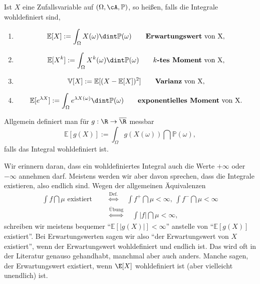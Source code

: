 \begin{deff}
	Ist $X$ eine Zufallsvariable auf $(\Omega, \cA, \mathbb{P})$, so heißen, falls die Integrale wohldefiniert sind,
	\begin{enumerate}[label=(\roman*)]
		\item \[ \mathbb{E}[X] := \int_{\Omega} X(\omega) \dint \mathbb{P}(\omega) \qquad \text{\textbf{Erwartungswert} von X}, \] 
		\item \[ \mathbb{E}[X^k] := \int_{\Omega} X^k(\omega) \dint \mathbb{P}(\omega) \qquad \text{\textbf{$k$-tes Moment} von X}, \]
		\item \[ \mathbb{V}[X] := \mathbb{E}[(X - \mathbb{E}[X])^2] \qquad \text{\textbf{Varianz} von X}, \]
		\item \[ \mathbb{E}[e^{\lambda X}] := \int_{\Omega} e^{\lambda X(\omega)} \dint \mathbb{P}(\omega) \qquad \text{\textbf{exponentielles Moment} von X.} \]
	\end{enumerate}
	Allgemein definiert man f\"ur $g:\R\to\overline \R$ messbar
		\[ \mathbb{E}[g(X)] := \int_{\Omega} g(X(\omega)) \dint \mathbb{P}(\omega), \]
	falls das Integral wohldefiniert ist. 
\end{deff}
Wir erinnern daran, dass ein wohldefiniertes Integral auch die Werte $+\infty$ oder $-\infty$ annehmen darf. Meistens werden wir aber davon sprechen, dass die Integrale existieren, also endlich sind. Wegen der allgemeinen \"Aquivalenzen 
\begin{align*}
	\int f \dint \mu \text{ existiert } \quad&\overset{\text{Def.}}{\Leftrightarrow}\quad \int f^+ \dint \mu < \infty, \: \int f^- \dint \mu < \infty\\
	&\overset{\text{\"Ubung}}{\Leftrightarrow}\quad \int |f| \dint \mu < \infty,
\end{align*}
schreiben wir meistens bequemer \enquote{$\mathbb{E}[|g(X)|] < \infty$} anstelle von \enquote{$\mathbb{E}[g(X)]$ existiert}. Bei Erwartungswerten sagen wir also \enquote{der Erwartungswert von $X$ existiert}, wenn der Erwartungswert wohldefiniert und endlich ist. Das wird oft in der Literatur genauso gehandhabt, manchmal aber auch anders. Manche sagen, der Erwartungswert existiert, wenn $\E[X]$ wohldefiniert ist (aber vielleicht unendlich) ist.
